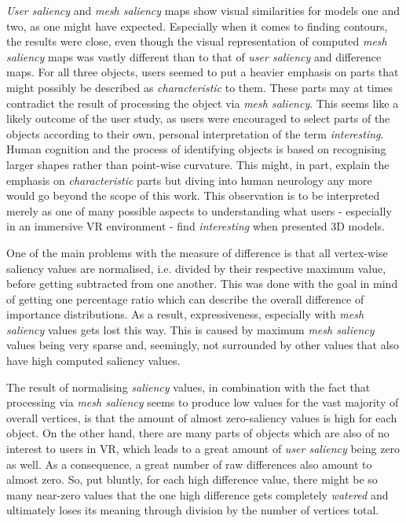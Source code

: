 \textit{User saliency} and \textit{mesh saliency} maps show visual similarities for models one and two, as one might have expected. Especially when it comes to finding contours, the results were close, even though the visual representation of computed \textit{mesh saliency} maps was vastly different than to that of \textit{user saliency} and difference maps. For all three objects, users seemed to put a heavier emphasis on parts that might possibly be described as \textit{characteristic} to them. These parts may at times contradict the result of processing the object via \textit{mesh saliency}. This seems like a likely outcome of the user study, as users were encouraged to select parts of the objects according to their own, personal interpretation of the term \textit{interesting}. Human cognition and the process of identifying objects is based on recognising larger shapes rather than point-wise curvature. This might, in part, explain the emphasis on \textit{characteristic} parts but diving into human neurology any more would go beyond the scope of this work. This observation is to be interpreted merely as one of many possible aspects to understanding what users - especially in an immersive VR environment - find \textit{interesting} when presented 3D models.

One of the main problems with the measure of difference is that all vertex-wise saliency values are normalised, i.e. divided by their respective maximum value, before getting subtracted from one another. This was done with the goal in mind of getting one percentage ratio which can describe the overall difference of importance distributions. As a result, expressiveness, especially with \textit{mesh saliency} values gets lost this way. This is caused by maximum \textit{mesh saliency} values being very sparse and, seemingly, not surrounded by other values that also have high computed saliency values.

The result of normalising \textit{saliency} values, in combination with the fact that processing via \textit{mesh saliency} seems to produce low values for the vast majority of overall vertices, is that the amount of almost zero-saliency values is high for each object. On the other hand, there are many parts of objects which are also of no interest to users in VR, which leads to a great amount of \textit{user saliency} being zero as well. As a consequence, a great number of raw differences also amount to almost zero. So, put bluntly, for each high difference value, there might be so many near-zero values that the one high difference gets completely \textit{watered} and ultimately loses its meaning through division by the number of vertices total.

